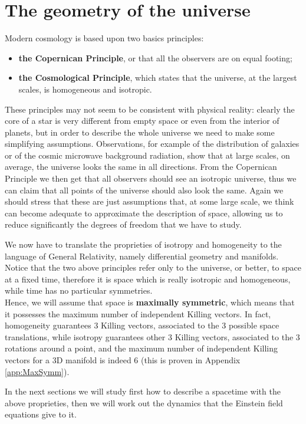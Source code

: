 \section{The geometry of the universe}
Modern cosmology is based upon two basics principles:
\begin{itemize}
    \item \textbf{the Copernican Principle}, or that all the observers are on equal footing;
    \item \textbf{the Cosmological Principle}, which states that the universe, at the largest scales, is homogeneous and isotropic.
\end{itemize}
These principles may not seem to be consistent with physical reality: clearly the core of a star is very different from empty space or even from the interior of planets, but in order to describe the whole universe we need to make some simplifying assumptions. Observations, for example of the distribution of galaxies or of the cosmic microwave background radiation, show that at large scales, on average, the universe looks the same in all directions. From the Copernican Principle we then get that all observers should see an isotropic universe, thus we can claim that all points of the universe should also look the same. Again we should stress that these are just assumptions that, at some large scale, we think can become adequate to approximate the description of space, allowing us to reduce significantly the degrees of freedom that we have to study.

We now have to translate the proprieties of isotropy and homogeneity to the language of General Relativity, namely differential geometry and manifolds.\\ Notice that the two above principles refer only to the universe, or better, to space at a fixed time, therefore it is space which is really isotropic and homogeneous, while time has no particular symmetries.\\
Hence, we will assume that space is \textbf{maximally symmetric}, which means that it possesses the maximum number of independent Killing vectors. In fact, homogeneity guarantees 3 Killing vectors, associated to the 3 possible space translations, while isotropy guarantees other 3 Killing vectors, associated to the 3 rotations around a point, and the maximum number of independent Killing vectors for a 3D manifold is indeed 6 (this is proven in Appendix \ref{app:MaxSymm}).

In the next sections we will study first how to describe a spacetime with the above proprieties, then we will work out the dynamics that the Einstein field equations give to it.
